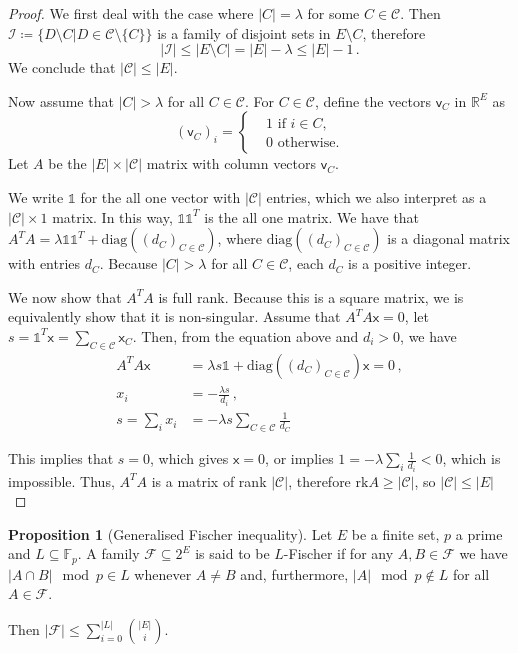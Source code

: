 \documentclass[12pt]{amsart}
\theoremstyle{definition}
\newtheorem{prop}[thm]{Proposition}
\newcommand{\R}{\mathbb{R}}
\newcommand{\F}{\mathbb{F}}
\newcommand{\one}{\mathbb{1}}
\newcommand{\CC}{\mathcal C}
\newcommand{\II}{\mathcal I}
\newcommand{\FF}{\mathcal F}
\newcommand{\vv}{\mathsf{v}}
\newcommand{\vx}{\mathsf{x}}
\newcommand{\rk}{\mathrm{rk}}
\begin{document}
\begin{proof}
We first deal with the case where $|C| = \lambda $ for some $C \in \CC$.
Then $\II \coloneqq \{ D \setminus C | D \in \CC \setminus \{C\} \}$ is a family of disjoint sets in $E \setminus C$, therefore
$$ |\II| \leq |E\setminus C| = |E| - \lambda \leq |E| - 1\, .$$
We conclude that $|\CC| \leq |E|$.

Now assume that $|C| > \lambda $ for all $C \in \CC$.
For $C \in \CC$, define the vectors $\vv_C$ in $\R^E$ as 
$$ (\vv_C)_i =\begin{cases*}
      & 1 \text{ if $i \in C$,}\\
      & 0 \text{ otherwise.}
    \end{cases*} $$
Let $A$ be the $|E| \times |\CC|$ matrix with column vectors $\vv_C$.

We write $\one $ for the all one vector with $|\CC|$ entries, which we also interpret as a $|\CC| \times 1$ matrix.
In this way, $\one \one^T$ is the all one matrix.
We have that $A^T A  = \lambda \one \one^T + \mathrm{diag}((d_C)_{C\in\CC})$, where $\mathrm{diag}((d_C)_{C\in\CC})$ is a diagonal matrix with entries $d_C$.
Because $|C| > \lambda$ for all $C \in \CC$, each $d_C$ is a positive integer.

We now show that $A^T A$ is full rank.
Because this is a square matrix, we is equivalently show that it is non-singular.
Assume that $A^T A \vx = 0$, let $s = \one^T \vx = \sum_{C \in \CC} \vx_C$.
Then, from the equation above and $d_i > 0$, we have
\begin{align*}
A^T A \vx &= \lambda s \one + \mathrm{diag}((d_C)_{C\in\CC}) \vx = 0\, , \\
x_i &= -\frac{\lambda s}{d_i} \, , \\
s = \sum_i x_i &= - \lambda s \sum_{C \in \CC}\frac{1}{d_C}
\end{align*}

This implies that $s = 0$, which gives $\vx = 0$, or implies $1 = -\lambda \sum_i\frac{1}{d_i} < 0$, which is impossible.
Thus, $A^T A$ is a matrix of rank $|\CC|$, therefore $\rk A \geq |\CC|$, so $|\CC| \leq |E|$
\end{proof}


\begin{prop}[Generalised Fischer inequality]
Let $E$ be a finite set, $p$ a prime and $L \subseteq \F_p$.
A family $\FF \subseteq 2^E$ is said to be $L$-Fischer if for any $A, B \in \FF $ we have $|A\cap B| \mod p \in L$ whenever $A \neq B$ and, furthermore, $|A| \mod p \not \in L$ for all $A \in \FF$.

Then $|\FF| \leq \sum_{i=0}^{|L|} \binom{|E|}{i}$.
\end{prop}
\end{document}
